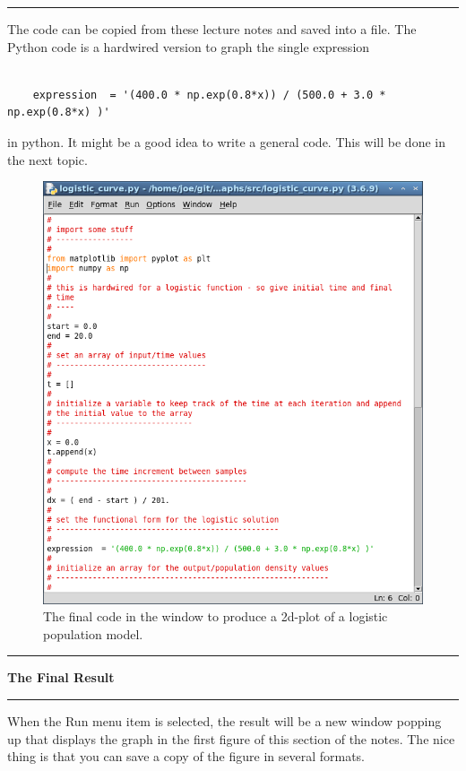\documentclass[10pt,fleqn]{article}
\begin{document}
\vskip0.1in\hrule\vskip0.1in\noindent
The code can be copied from these lecture notes and saved into a file. The
Python code is a hardwired version to graph the single expression
\begin{verbatim}

    expression  = '(400.0 * np.exp(0.8*x)) / (500.0 + 3.0 * np.exp(0.8*x) )'

\end{verbatim}
in python. It might be a good idea to write a general code. This will be done
in the next topic.
\vfill
\begin{figure}[h]
\centering
\includegraphics[width=6.0in]{../images/2dplot_05.png}
\caption{The final code in the window to produce a 2d-plot of a logistic
         population model.}
\end{figure}
\eject
\vskip0.1in\hrule\vskip0.1in\noindent
{\bf The Final Result} 
\vskip0.1in\hrule\vskip0.1in\noindent
When the Run menu item is selected, the result will be a new window popping up
that displays the graph in the first figure of this section of the notes.
The nice thing is that you can save a copy of the figure in several formats.
\end{document}
